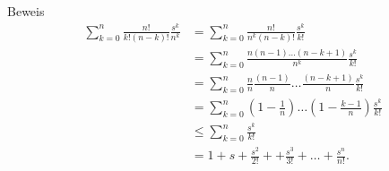 \documentclass[10pt]{beamer}
\begin{document}
\begin{frame}{Beweis}
    \begin{align*}
        \sum_{k = 0}^{n} \frac{n!}{k! \left( n - k \right)!} \frac{s^{k}}{n^{k}}
        & = \sum_{k = 0}^{n} \frac{n!}{n^{k} \left( n - k \right)!} \frac{s^{k}}{k!} \\
        & = \sum_{k = 0}^{n} \frac{n \left( n - 1 \right) \ldots \left( n - k + 1 \right)}{n^{k}} \frac{s^{k}}{k!} \\
        & = \sum_{k = 0}^{n} \frac{n}{n} \frac{\left( n - 1 \right)}{n} \ldots \frac{\left( n - k + 1 \right)}{n} \frac{s^{k}}{k!} \\
        & = \sum_{k = 0}^{n} \left( 1 - \frac{1}{n} \right) \ldots \left( 1 - \frac{k - 1}{n} \right) \frac{s^{k}}{k!} \\
        & \leq \sum_{k = 0}^{n} \frac{s^{k}}{k!} \\
        & = 1 + s + \frac{s^{2}}{2!} + + \frac{s^{3}}{3!} + \ldots + \frac{s^{n}}{n!}.
    \end{align*}
\end{frame}
\end{document}
